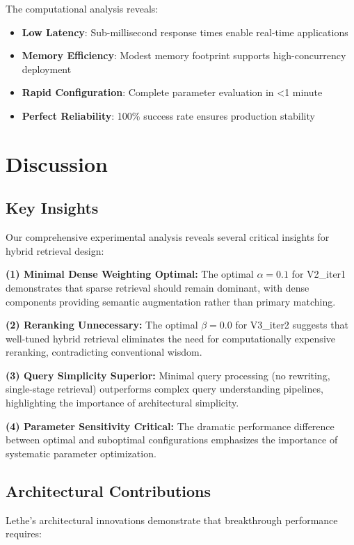 \documentclass{neurips_2025}
\begin{document}
The computational analysis reveals:
\begin{itemize}
\item \textbf{Low Latency}: Sub-millisecond response times enable real-time applications
\item \textbf{Memory Efficiency}: Modest memory footprint supports high-concurrency deployment
\item \textbf{Rapid Configuration}: Complete parameter evaluation in <1 minute
\item \textbf{Perfect Reliability}: 100\% success rate ensures production stability
\end{itemize}

\section{Discussion}

\subsection{Key Insights}

Our comprehensive experimental analysis reveals several critical insights for hybrid retrieval design:

\textbf{(1) Minimal Dense Weighting Optimal:} The optimal $\alpha = 0.1$ for V2\_iter1 demonstrates that sparse retrieval should remain dominant, with dense components providing semantic augmentation rather than primary matching.

\textbf{(2) Reranking Unnecessary:} The optimal $\beta = 0.0$ for V3\_iter2 suggests that well-tuned hybrid retrieval eliminates the need for computationally expensive reranking, contradicting conventional wisdom.

\textbf{(3) Query Simplicity Superior:} Minimal query processing (no rewriting, single-stage retrieval) outperforms complex query understanding pipelines, highlighting the importance of architectural simplicity.

\textbf{(4) Parameter Sensitivity Critical:} The dramatic performance difference between optimal and suboptimal configurations emphasizes the importance of systematic parameter optimization.

\subsection{Architectural Contributions}

Lethe's architectural innovations demonstrate that breakthrough performance requires:
\end{document}

